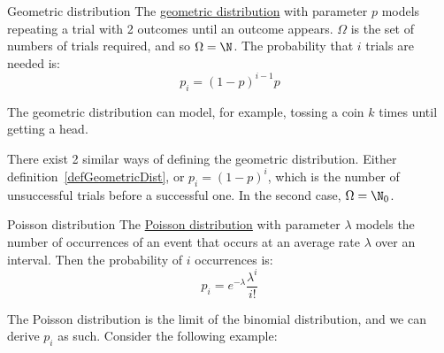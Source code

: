 \documentclass[../Main.tex]{subfiles}
\begin{document}
\begin{definition}{Geometric distribution}
    The \underline{geometric distribution} with parameter $p$ models repeating a trial with 2 outcomes until an outcome appears. $\Omega$ is the set of numbers of trials required, and so $\Omega = \N$. The probability that $i$ trials are needed is:
    \begin{equation*}
        p_i = (1-p)^{i-1}p
    \end{equation*}
    \label{defGeometricDist}
\end{definition}
The geometric distribution can model, for example, tossing a coin $k$ times until getting a head.
\begin{warning}
    There exist 2 similar ways of defining the geometric distribution. Either definition~\ref{defGeometricDist}, or $p_i = (1-p)^i$, which is the number of unsuccessful trials before a successful one. In the second case, $\Omega = \N_0$.
\end{warning}
\begin{definition}{Poisson distribution}
    The \underline{Poisson distribution} with parameter $\lambda$ models the number of occurrences of an event that occurs at an average rate $\lambda$ over an interval. Then the probability of $i$ occurrences is:
    \begin{equation*}
        p_i = e^{-\lambda}\frac{\lambda^i}{i!}
    \end{equation*}
\end{definition}
The Poisson distribution is the limit of the binomial distribution, and we can derive $p_i$ as such. Consider the following example:
\end{document}
